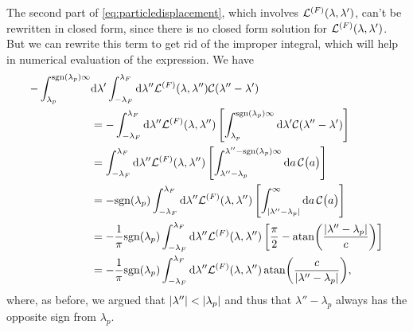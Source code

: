 \documentclass[11pt, a4paper]{report} %
\begin{document}
The second part of \cref{eq:particledisplacement}, which involves \(\mathcal{L}^{(F)}\qty(\lambda,\lambda')\), can't be rewritten in closed form, since there is no closed form solution for \(\mathcal{L}^{(F)}\qty(\lambda,\lambda')\).
But we can rewrite this term to get rid of the improper integral, which will help in numerical evaluation of the expression.
We have
\begin{align}
	- \int_{\lambda_p}^{\textrm{sgn}\qty(\lambda_p)\infty} &\dd \lambda' \int_{-\lambda_F}^{\lambda_F} \dd \lambda''  \mathcal{L}^{(F)}\qty(\lambda,\lambda'') \mathcal{C}\qty(\lambda''-\lambda')\\
	&= -  \int_{-\lambda_F}^{\lambda_F} \dd \lambda''   \mathcal{L}^{(F)}\qty(\lambda,\lambda'') \left[\int_{\lambda_p}^{\textrm{sgn}\qty(\lambda_p)\infty} \dd \lambda'\mathcal{C}\qty(\lambda''-\lambda') \right]\\
	&=   \int_{-\lambda_F}^{\lambda_F} \dd \lambda''   \mathcal{L}^{(F)}\qty(\lambda,\lambda'') \left[\int_{\lambda''-\lambda_p}^{\lambda''-\textrm{sgn}\qty(\lambda_p)\infty} \dd a\,\mathcal{C}\qty\big(a) \right]\\
	&= -\textrm{sgn}\qty(\lambda_p) \int_{-\lambda_F}^{\lambda_F} \dd \lambda''   \mathcal{L}^{(F)}\qty(\lambda,\lambda'') \left[\int_{\abs{\lambda''-\lambda_p}}^{\infty} \dd a\,\mathcal{C}\qty\big(a) \right]\\
	&= -\frac{1}{\pi}\textrm{sgn}\qty(\lambda_p) \int_{-\lambda_F}^{\lambda_F} \dd \lambda''   \mathcal{L}^{(F)}\qty(\lambda,\lambda'') \left[\frac{\pi}{2} - \atan(\frac{\abs{\lambda''-\lambda_p}}{c})\right]\\
	&= -\frac{1}{\pi}\textrm{sgn}\qty(\lambda_p) \int_{-\lambda_F}^{\lambda_F} \dd \lambda''   \mathcal{L}^{(F)}\qty(\lambda,\lambda'') \atan(\frac{c}{\abs{\lambda''-\lambda_p}}),
\end{align}
where, as before, we argued that \(\abs{\lambda''} < \abs{\lambda_p}\) and thus that \(\lambda'' - \lambda_p\) always has the opposite sign from \(\lambda_p\).
\end{document}
